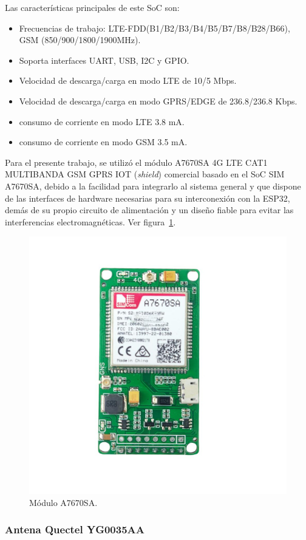 Las características principales de este SoC son: 

\begin{itemize}
    \item Frecuencias de trabajo: LTE-FDD(B1/B2/B3/B4/B5/B7/B8/B28/B66), GSM (850/900/1800/1900MHz).
    \item Soporta interfaces UART, USB, I2C y GPIO.
    \item Velocidad de descarga/carga en modo LTE de 10/5 Mbps.
    \item Velocidad de descarga/carga en modo GPRS/EDGE de 236.8/236.8 Kbps.
    \item consumo de corriente en modo LTE 3.8 mA.
    \item consumo de corriente en modo GSM 3.5 mA.
\end{itemize}

Para el presente trabajo, se utilizó el módulo A7670SA 4G LTE CAT1 MULTIBANDA GSM GPRS IOT (\textit{shield}) comercial basado en el SoC SIM A7670SA, debido a la facilidad para integrarlo al sistema general y que dispone de las interfaces de hardware necesarias para su interconexión con la ESP32, demás de su propio circuito de alimentación y un diseño fiable para evitar las interferencias electromagnéticas. Ver figura~\ref{fig:A7670SA_2}.

\begin{figure}[htbp]
	\centering
	\includegraphics[width=.5\textwidth]{./Figures/A7670SA_Mod.jpg}
	\caption{Módulo A7670SA\protect\footnotemark.}
	\label{fig:A7670SA_2}
\end{figure}

\subsubsection{Antena Quectel YG0035AA}

